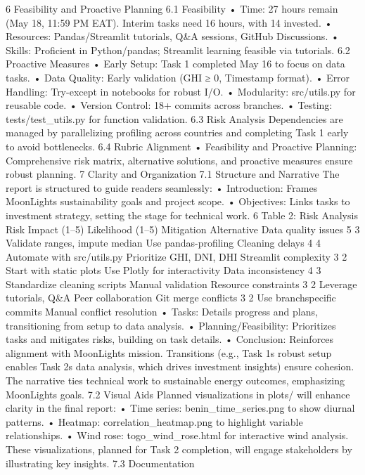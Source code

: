 6 Feasibility and Proactive Planning
6.1 Feasibility
• Time: 27 hours remain (May 18, 11:59 PM EAT). Interim tasks need 16 hours, with 14
invested.
• Resources: Pandas/Streamlit tutorials, Q&A sessions, GitHub Discussions.
• Skills: Proficient in Python/pandas; Streamlit learning feasible via tutorials.
6.2 Proactive Measures
• Early Setup: Task 1 completed May 16 to focus on data tasks.
• Data Quality: Early validation (GHI ≥ 0, Timestamp format).
• Error Handling: Try-except in notebooks for robust I/O.
• Modularity: src/utils.py for reusable code.
• Version Control: 18+ commits across branches.
• Testing: tests/test_utils.py for function validation.
6.3 Risk Analysis
Dependencies are managed by parallelizing profiling across countries and completing Task 1
early to avoid bottlenecks.
6.4 Rubric Alignment
• Feasibility and Proactive Planning: Comprehensive risk matrix, alternative solutions,
and proactive measures ensure robust planning.
7 Clarity and Organization
7.1 Structure and Narrative
The report is structured to guide readers seamlessly:
• Introduction: Frames MoonLights sustainability goals and project scope.
• Objectives: Links tasks to investment strategy, setting the stage for technical work.
6
Table 2: Risk Analysis
Risk Impact
(1–5)
Likelihood
(1–5)
Mitigation Alternative
Data quality issues
5 3 Validate ranges,
impute median
Use
pandas-profiling
Cleaning delays 4 4 Automate with
src/utils.py
Prioritize GHI,
DNI, DHI
Streamlit complexity
3 2 Start with static
plots
Use Plotly for interactivity
Data inconsistency
4 3 Standardize
cleaning scripts
Manual validation
Resource constraints
3 2 Leverage tutorials, Q&A
Peer collaboration
Git merge conflicts
3 2 Use branchspecific commits
Manual conflict
resolution
• Tasks: Details progress and plans, transitioning from setup to data analysis.
• Planning/Feasibility: Prioritizes tasks and mitigates risks, building on task details.
• Conclusion: Reinforces alignment with MoonLights mission.
Transitions (e.g., Task 1s robust setup enables Task 2s data analysis, which drives investment
insights) ensure cohesion. The narrative ties technical work to sustainable energy outcomes,
emphasizing MoonLights goals.
7.2 Visual Aids
Planned visualizations in plots/ will enhance clarity in the final report:
• Time series: benin_time_series.png to show diurnal patterns.
• Heatmap: correlation_heatmap.png to highlight variable relationships.
• Wind rose: togo_wind_rose.html for interactive wind analysis.
These visualizations, planned for Task 2 completion, will engage stakeholders by illustrating
key insights.
7.3 Documentation

